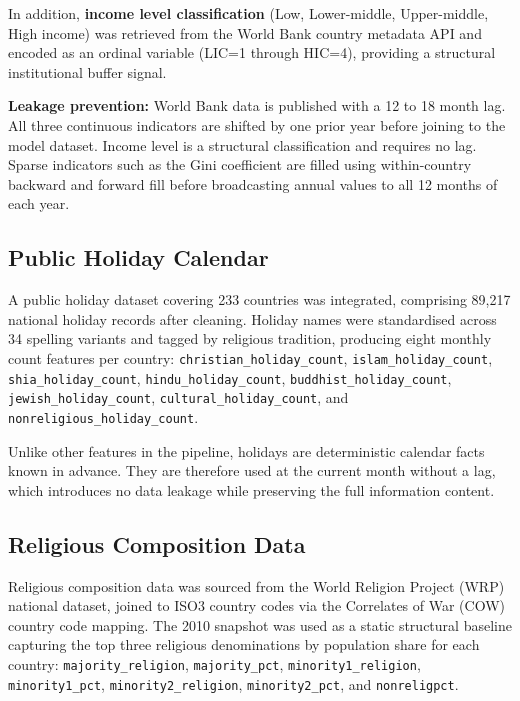 \documentclass[12pt,a4paper]{article}
\begin{document}
In addition, \textbf{income level classification} (Low, Lower-middle,
Upper-middle, High income) was retrieved from the World Bank country
metadata API and encoded as an ordinal variable (LIC=1 through HIC=4),
providing a structural institutional buffer signal.

\textbf{Leakage prevention:} World Bank data is published with a 12 to
18 month lag. All three continuous indicators are shifted by one prior
year before joining to the model dataset. Income level is a structural
classification and requires no lag. Sparse indicators such as the Gini
coefficient are filled using within-country backward and forward fill
before broadcasting annual values to all 12 months of each year.

\subsection{Public Holiday Calendar}

A public holiday dataset covering 233 countries was integrated, comprising
89,217 national holiday records after cleaning. Holiday names were
standardised across 34 spelling variants and tagged by religious
tradition, producing eight monthly count features per country:
\texttt{christian\_holiday\_count}, 
\texttt{islam\_holiday\_count},
\texttt{shia\_holiday\_count}, \texttt{hindu\_holiday\_count},
\texttt{buddhist\_holiday\_count}, \texttt{jewish\_holiday\_count},
\texttt{cultural\_holiday\_count}, and
\texttt{nonreligious\_holiday\_count}.

Unlike other features in the pipeline, holidays are deterministic
calendar facts known in advance. They are therefore used at the
current month without a lag, which introduces no data leakage while
preserving the full information content.

\subsection{Religious Composition Data}

Religious composition data was sourced from the World Religion Project
(WRP) national dataset, joined to ISO3 country codes via the Correlates
of War (COW) country code mapping. The 2010 snapshot was used as a
static structural baseline capturing the top three religious denominations
by population share for each country:
\texttt{majority\_religion}, \texttt{majority\_pct},
\texttt{minority1\_religion}, \texttt{minority1\_pct},
\texttt{minority2\_religion}, \texttt{minority2\_pct}, and
\texttt{nonreligpct}.
\end{document}
